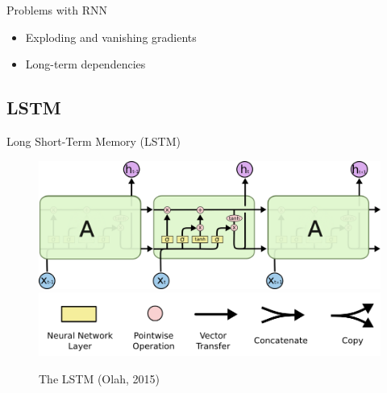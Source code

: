 \documentclass[10pt]{beamer}
\begin{document}
\begin{frame}{Problems with RNN}

\begin{itemize}
\item {\color{uured} Exploding and vanishing} gradients
\item {\color{uured} Long-term} dependencies
\end{itemize}

\end{frame}






\subsection{LSTM}


\begin{frame}{Long Short-Term Memory (LSTM)}

\begin{figure}[h]
\centering
\includegraphics[width=1\textwidth]{fig/Olah_LSTM1.png}
\includegraphics[width=1\textwidth]{fig/Olah_LSTM1b.png}
\caption{The LSTM (Olah, 2015)}
\end{figure}

\end{frame}
\end{document}
